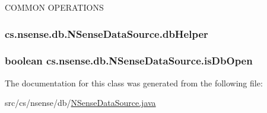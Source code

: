 C\-O\-M\-M\-O\-N O\-P\-E\-R\-A\-T\-I\-O\-N\-S \hypertarget{classcs_1_1nsense_1_1db_1_1_n_sense_data_source_a20dfb43e35ec83f4b91472ba463d3612}{
\subsubsection[{db\-Helper}]{ cs.\-nsense.\-db.\-N\-Sense\-Data\-Source.\-db\-Helper\hspace{0.3cm}{\ttfamily [private]}}}\label{classcs_1_1nsense_1_1db_1_1_n_sense_data_source_a20dfb43e35ec83f4b91472ba463d3612}
\hypertarget{classcs_1_1nsense_1_1db_1_1_n_sense_data_source_a43cad7a6e5aa89f93d0f70c2424acbf9}{
\subsubsection[{is\-Db\-Open}]{\setlength{\rightskip}{0pt plus 5cm}boolean cs.\-nsense.\-db.\-N\-Sense\-Data\-Source.\-is\-Db\-Open\hspace{0.3cm}{\ttfamily [private]}}}\label{classcs_1_1nsense_1_1db_1_1_n_sense_data_source_a43cad7a6e5aa89f93d0f70c2424acbf9}


The documentation for this class was generated from the following file\-:\begin{DoxyCompactItemize}
\item 
src/cs/nsense/db/\hyperlink{_n_sense_data_source_8java}{N\-Sense\-Data\-Source.\-java}\end{DoxyCompactItemize}
